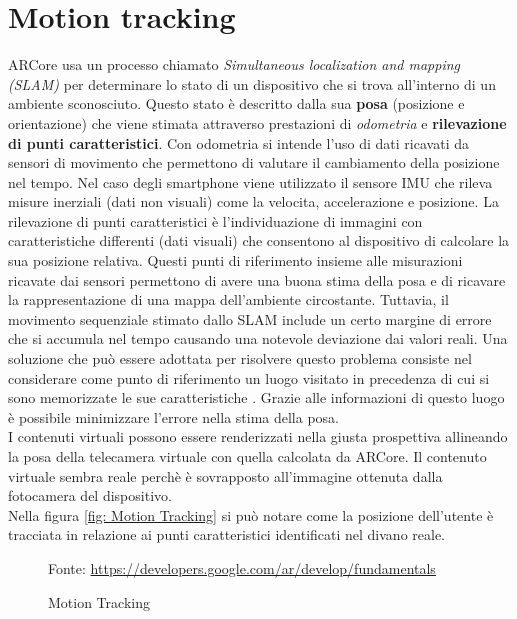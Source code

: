 \documentclass[crop=false, class=book]{standalone}
\begin{document}
	\section{Motion tracking}
	
		ARCore usa un processo chiamato \emph{Simultaneous localization and mapping (SLAM)} per determinare lo stato di un
		dispositivo che si trova all'interno di un ambiente sconosciuto. Questo stato è descritto dalla sua \textbf{posa} 				(posizione e orientazione) che viene stimata attraverso prestazioni di \emph{odometria} e \textbf{rilevazione di punti 			caratteristici}. Con odometria si intende l'uso di dati ricavati da sensori di movimento che permettono di 						valutare il cambiamento della posizione nel tempo. Nel caso degli smartphone viene utilizzato il sensore IMU che 				rileva misure inerziali (dati non visuali) come la velocita, accelerazione e posizione. La rilevazione di 						punti caratteristici è l'individuazione di immagini con caratteristiche differenti (dati visuali) che							consentono al dispositivo di calcolare la sua posizione relativa. Questi punti di riferimento insieme alle misurazioni 			ricavate dai sensori permettono di avere una buona stima della posa e di ricavare la rappresentazione di una mappa 				dell'ambiente circostante. Tuttavia, il movimento sequenziale stimato dallo SLAM include un certo margine di errore che 		si accumula nel tempo causando una notevole deviazione dai valori reali. Una soluzione che può essere adottata per 				risolvere questo problema consiste nel considerare come punto di riferimento un luogo visitato in precedenza di cui si 			sono memorizzate le sue caratteristiche \cite{mathworks2022slam}. Grazie alle informazioni di questo luogo è possibile 			minimizzare l'errore nella stima della posa.\\
		I contenuti virtuali possono essere renderizzati nella giusta prospettiva allineando la posa della telecamera virtuale 			con quella calcolata da ARCore. Il contenuto virtuale sembra reale perchè è sovrapposto all'immagine ottenuta dalla 			fotocamera del dispositivo.\\
		Nella figura \vref{fig: Motion Tracking} si può notare come la posizione dell'utente è tracciata in relazione ai punti 			caratteristici identificati nel divano reale.
		
		\begin{figure}
				\centering
				{Fonte: \url{https://developers.google.com/ar/develop/fundamentals}}
				\caption{Motion Tracking}
				\label{fig: Motion Tracking}
		\end{figure}
		
\end{document}
